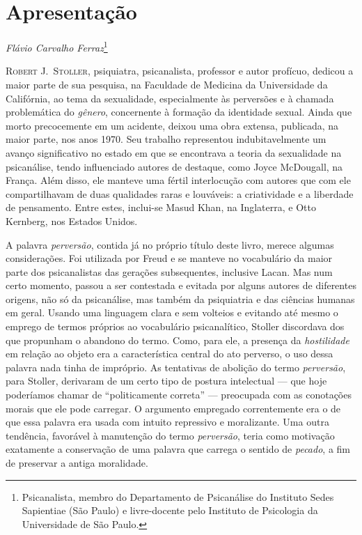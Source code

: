 \chapter[Apresentação, por Flávio Carvalho Ferraz]{Apresentação}
\bigskip

\hfill\textit{Flávio Carvalho Ferraz}\footnote{ Psicanalista, membro do
Departamento de Psicanálise do Instituto Sedes Sapientiae (São Paulo) e
livre-docente pelo Instituto de Psicologia da Universidade de São Paulo.}
\bigskip


\textsc{Robert J.~Stoller,} psiquiatra, psicanalista, professor e autor profícuo,
dedicou a maior parte de sua pesquisa, na Faculdade de Medicina da
Universidade da Califórnia, ao tema da sexualidade, especialmente às
perversões e à chamada problemática do \textit{gênero}, concernente à
formação da identidade sexual. Ainda que morto precocemente em um acidente,
deixou uma obra extensa, publicada, na maior parte, nos anos 1970. Seu
trabalho representou indubitavelmente um avanço significativo no estado em
que se encontrava a teoria da sexualidade na psicanálise, tendo
influenciado autores de destaque, como Joyce McDougall, na França. Além
disso, ele manteve uma fértil interlocução com autores que com ele
compartilhavam de duas qualidades raras e louváveis: a criatividade e a
liberdade de pensamento. Entre estes, inclui-se Masud Khan, na Inglaterra,
e Otto Kernberg, nos Estados Unidos.

A palavra \textit{perversão}, contida já no próprio título deste livro,
merece algumas considerações. Foi utilizada por Freud e se manteve no
vocabulário da maior parte dos psicanalistas das gerações subsequentes,
inclusive Lacan. Mas num certo momento, passou a ser contestada e evitada
por alguns autores de diferentes origens, não só da psicanálise, mas também
da psiquiatria e das ciências humanas em geral. Usando uma linguagem clara
e sem volteios e evitando até mesmo o emprego de termos próprios ao
vocabulário psicanalítico, Stoller discordava dos que propunham o abandono
do termo. Como, para ele, a presença da \textit{hostilidade} em relação ao
objeto era a característica central do ato perverso, o uso dessa palavra
nada tinha de impróprio. As tentativas de abolição do termo
\textit{perversão}, para Stoller, derivaram de um certo tipo de postura
intelectual --- que hoje poderíamos chamar de “politicamente correta” ---
preocupada com as conotações morais que ele pode carregar. O argumento
empregado correntemente era o de que essa palavra era usada com intuito
repressivo e moralizante. Uma outra tendência, favorável à manutenção do
termo \textit{perversão}, teria como motivação exatamente a conservação de
uma palavra que carrega o sentido de \textit{pecado}, a fim de preservar a
antiga moralidade.

